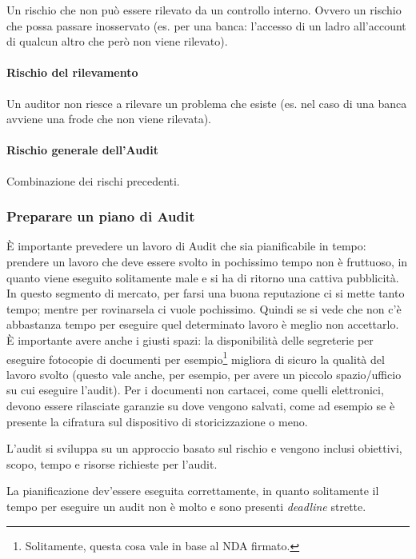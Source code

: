 Un rischio che non può essere rilevato da un controllo interno. Ovvero un
rischio che possa passare inosservato (es. per una banca: l'accesso di un ladro
all'account di qualcun altro che però non viene rilevato).


\paragraph*{Rischio del rilevamento}

Un auditor non riesce a rilevare un problema che esiste (es. nel caso
di una banca avviene una frode che non viene rilevata).

\paragraph*{Rischio generale dell'Audit}

Combinazione dei rischi precedenti.


\subsubsection{Preparare un piano di Audit}

È importante prevedere un lavoro di Audit che sia pianificabile in tempo:
prendere un lavoro che deve essere svolto in pochissimo tempo non è
fruttuoso, in quanto viene eseguito solitamente male e si ha di
ritorno una cattiva pubblicità. In questo segmento di mercato, per farsi una
buona reputazione ci si mette tanto tempo; mentre per rovinarsela ci vuole
pochissimo.
Quindi se si vede che non c'è abbastanza tempo per eseguire quel determinato
lavoro è meglio non accettarlo.
È importante avere anche i giusti spazi: la disponibilità delle segreterie per
eseguire fotocopie di documenti per esempio\footnote{Solitamente, questa cosa
vale in base al NDA firmato.} migliora di sicuro la qualità del lavoro svolto
(questo vale anche, per esempio, per avere un piccolo spazio/ufficio su cui
eseguire l'audit). Per i documenti non cartacei, come quelli elettronici,
devono essere rilasciate garanzie su dove vengono salvati, come ad esempio se è
presente la cifratura sul dispositivo di storicizzazione o meno.

L'audit si sviluppa su un approccio basato sul rischio e vengono inclusi
obiettivi, scopo, tempo e risorse richieste per l'audit.

La pianificazione dev'essere eseguita correttamente, in quanto solitamente il
tempo per eseguire un audit non è molto e sono presenti \textit{deadline}
strette.

